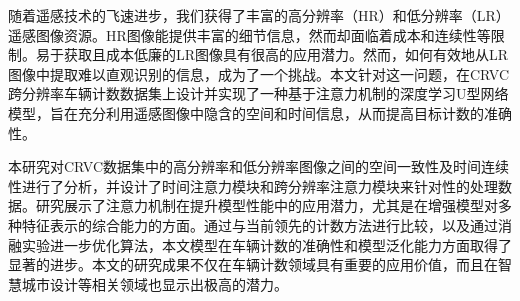 
随着遥感技术的飞速进步，我们获得了丰富的高分辨率（HR）和低分辨率（LR）遥感图像资源。HR图像能提供丰富的细节信息，然而却面临着成本和连续性等限制。易于获取且成本低廉的LR图像具有很高的应用潜力。然而，如何有效地从LR图像中提取难以直观识别的信息，成为了一个挑战。本文针对这一问题，在CRVC跨分辨率车辆计数数据集上设计并实现了一种基于注意力机制的深度学习U型网络模型，旨在充分利用遥感图像中隐含的空间和时间信息，从而提高目标计数的准确性。

本研究对CRVC数据集中的高分辨率和低分辨率图像之间的空间一致性及时间连续性进行了分析，并设计了时间注意力模块和跨分辨率注意力模块来针对性的处理数据。研究展示了注意力机制在提升模型性能中的应用潜力，尤其是在增强模型对多种特征表示的综合能力的方面。通过与当前领先的计数方法进行比较，以及通过消融实验进一步优化算法，本文模型在车辆计数的准确性和模型泛化能力方面取得了显著的进步。本文的研究成果不仅在车辆计数领域具有重要的应用价值，而且在智慧城市设计等相关领域也显示出极高的潜力。

